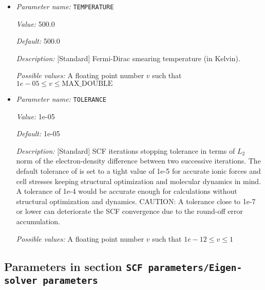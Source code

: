 \begin{itemize}
{\it Value:} RANDOM


{\it Default:} RANDOM


{\it Description:} [Standard] Sets the type of the starting Kohn-Sham wavefunctions guess: Atomic(Superposition of single atom atomic orbitals. Atom types for which atomic orbitals are not available, random wavefunctions are taken. Currently, atomic orbitals data is not available for all atoms.), Random(The starting guess for all wavefunctions are taken to be random). Default: RANDOM.


{\it Possible values:} Any one of ATOMIC, RANDOM
\item {\it Parameter name:} {\tt TEMPERATURE}
\label{parameters:SCF parameters/TEMPERATURE}
\label{parameters:SCF_20parameters/TEMPERATURE}


{\it Value:} 500.0


{\it Default:} 500.0


{\it Description:} [Standard] Fermi-Dirac smearing temperature (in Kelvin).


{\it Possible values:} A floating point number $v$ such that $1e-05 \leq v \leq \text{MAX\_DOUBLE}$
\item {\it Parameter name:} {\tt TOLERANCE}
\label{parameters:SCF parameters/TOLERANCE}
\label{parameters:SCF_20parameters/TOLERANCE}


{\it Value:} 1e-05


{\it Default:} 1e-05


{\it Description:} [Standard] SCF iterations stopping tolerance in terms of $L_2$ norm of the electron-density difference between two successive iterations. The default tolerance of is set to a tight value of 1e-5 for accurate ionic forces and cell stresses keeping structural optimization and molecular dynamics in mind. A tolerance of 1e-4 would be accurate enough for calculations without structural optimization and dynamics. CAUTION: A tolerance close to 1e-7 or lower can deteriorate the SCF convergence due to the round-off error accumulation.


{\it Possible values:} A floating point number $v$ such that $1e-12 \leq v \leq 1$
\end{itemize}



\subsection{Parameters in section \tt SCF parameters/Eigen-solver parameters}
\label{parameters:SCF_20parameters/Eigen_2dsolver_20parameters}

